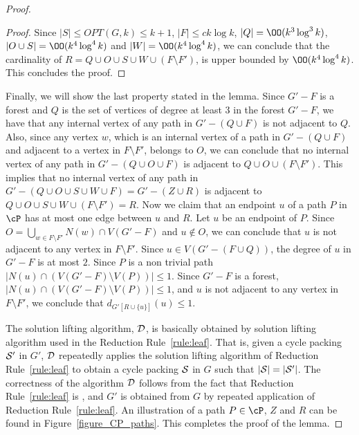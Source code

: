 \begin{proof}
\begin{proof}
Since $\vert S\vert\leq OPT(G,k)\leq k+1$, $\vert F\vert\leq ck\log k$, $\vert Q\vert=\OO(k^3\log^3 k)$, $\vert O \cup S \vert =\OO( k^4\log^4 k)$ and $\vert W \vert= \OO( k^4\log^4 k)$, we can conclude that the cardinality of 
$R=Q\cup O \cup S \cup W \cup (F\setminus F')$, is upper bounded by $\OO(k^4\log^4 k)$. This concludes the proof. 
\end{proof}
Finally, we will show the last property stated in the lemma. 
Since $G'-F$ is a forest and $Q$ is the set of vertices of degree at least $3$ in the forest $G'-F$, 
we have that  any internal vertex of any path in $G'-(Q\cup F)$ is not adjacent to $Q$. 
Also, since any vertex $w$, which is an internal vertex of a path in $G'-(Q\cup F)$ and 
adjacent to a vertex in $F\setminus F'$, belongs to $O$, we can conclude that no internal vertex of any path in $G'-(Q\cup O \cup F)$ is adjacent to 
$Q\cup O \cup (F\setminus F')$. This implies that  
no internal vertex of any path in $G'-(Q\cup O\cup S \cup W \cup F)= G'-(Z\cup R)$ is adjacent to 
$Q\cup O \cup S \cup W \cup (F\setminus F') = R$.  
Now we claim that an endpoint $u$ of a path $P$ in $\cP$ has at most 
one edge between $u$ and $R$. 
Let $u$ be an endpoint of $P$. 
Since  $O=\bigcup_{w\in F\setminus F'} N(w)\cap V(G'-F)$ and $u\notin O$, we can conclude that $u$ is not adjacent to 
any vertex in $F\setminus F'$. 
Since $u\in V(G'-(F\cup Q))$, the degree of 
$u$ in $G'-F$ is at most $2$. Since $P$ is a non trivial path $\vert N(u)\cap (V(G'-F)\setminus V(P))\vert \leq 1$. 
Since $G'-F$ is a forest, $\vert N(u)\cap (V(G'-F)\setminus V(P))\vert \leq 1$, and $u$ is not adjacent to any vertex in $F\setminus F'$, 
we conclude that $d_{G'[R\cup \{u\}]}(u)\leq 1$.  

The solution lifting algorithm, ${\cal D}$,  is basically obtained by solution lifting algorithm 
used in the Reduction Rule~\ref{rule:leaf}. That is,   given a cycle packing ${\cal S'}$ in $G'$,  $\cal D$ 
repeatedly applies the solution lifting algorithm of  Reduction Rule~\ref{rule:leaf} to obtain a cycle packing ${\cal S}$ in $G$ such that $\vert {\cal S}\vert=\vert {\cal S'}\vert$. The correctness of the algorithm ${\cal D}$ follows 
from the fact that Reduction Rule~\ref{rule:leaf} is \onesafe, 
and $G'$ is obtained from $G$ by repeated application of 
Reduction Rule~\ref{rule:leaf}.  
An illustration of a path $P\in \cP$, $Z$ and $R$ can be found in Figure~\ref{figure_CP_paths}. 
This completes the proof of the lemma. 
\end{proof}


